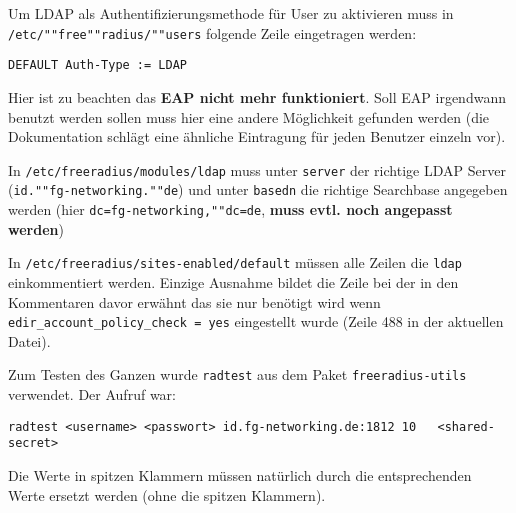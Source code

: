 \documentclass[11pt,a4paper,titlepage=firstiscover,headsepline,bibtotoc]{scrartcl} %
\begin{document}
Um LDAP als Authentifizierungsmethode für User zu aktivieren muss in \texttt{/etc/""free""radius/""users} folgende Zeile eingetragen werden:
\begin{lstlisting}
DEFAULT Auth-Type := LDAP
\end{lstlisting}
Hier ist zu beachten das \textbf{EAP nicht mehr funktioniert}. Soll EAP irgendwann benutzt werden sollen muss hier eine andere Möglichkeit gefunden werden (die Dokumentation schlägt eine ähnliche Eintragung für jeden Benutzer einzeln vor).

In \texttt{/etc/freeradius/modules/ldap} muss unter \texttt{server} der richtige LDAP Server (\texttt{id.""fg-networking.""de}) und unter \texttt{basedn} die richtige Searchbase angegeben werden (hier \texttt{dc=fg-networking,""dc=de}, \textbf{muss evtl. noch angepasst werden})

In \texttt{/etc/freeradius/sites-enabled/default} müssen alle Zeilen die \texttt{ldap} einkommentiert werden. Einzige Ausnahme bildet die Zeile bei der in den Kommentaren davor erwähnt das sie nur benötigt wird wenn \texttt{edir\_account\_policy\_check = yes} eingestellt wurde (Zeile 488 in der aktuellen Datei).

Zum Testen des Ganzen wurde \texttt{radtest} aus dem Paket \texttt{freeradius-utils} verwendet. Der Aufruf war:
\begin{lstlisting}
radtest <username> <passwort> id.fg-networking.de:1812 10	<shared-secret>
\end{lstlisting}
Die Werte in spitzen Klammern müssen natürlich durch die entsprechenden Werte ersetzt werden (ohne die spitzen Klammern).


\newpage
\end{document}
